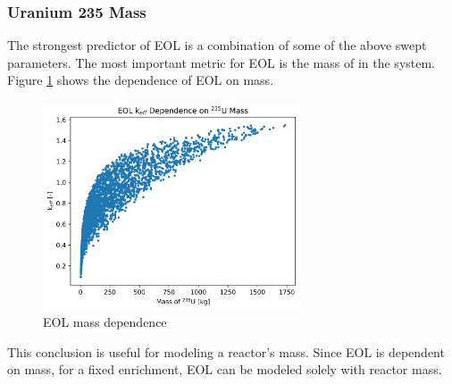 \subsubsection{Uranium 235 Mass}
The strongest predictor of EOL \keff is a combination of some of the above
swept parameters. The most important metric for EOL \keff is the mass of \uran
in the system. Figure \ref{fig:eol_keff_vs_235_mass} shows the dependence of EOL
\keff on \uran mass.

\begin{figure}[h]
    \centering
    \includegraphics[width=3in]{../images/keff_vs_mass_235.png}
\caption{EOL \keff \uran mass dependence}
\label{fig:eol_keff_vs_235_mass}
\end{figure}

This conclusion is useful for modeling a reactor's mass. Since EOL \keff is
dependent on \uran mass, for a fixed enrichment, EOL \keff can be modeled 
solely with reactor mass.
